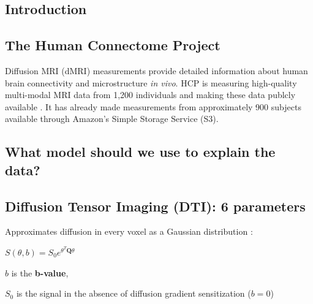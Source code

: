 \documentclass[a0, landscape]{a0poster}
\begin{document}
\begin{multicols}{3} %


\section*{Introduction}

\subsection*{The Human Connectome Project}

Diffusion MRI (dMRI) measurements provide detailed information about human brain
connectivity and microstructure \emph{in vivo}. HCP is measuring high-quality
multi-modal MRI data from 1,200 individuals and making these data publcly
available \cite{VanEssen2012}. It has already made measurements from
approximately 900 subjects available through Amazon's Simple Storage Service
(S3).

\subsection*{What model should we use to explain the data?}

\subsection*{Diffusion Tensor Imaging (DTI): 6 parameters}

Approximates diffusion in every voxel as a Gaussian distribution
\cite{Basser1994-hg}:

\vspace{2mm}
\begin{center}
\begin{large}

$S(\theta, b) = S_0 e^{\theta^T \mathbf{Q} \theta} $

\end{large}
\end{center}

\noindent $b$ is the \textbf {b-value},

\noindent $S_0$ is the signal in the absence of diffusion gradient sensitization ($b=0$)


\end{multicols}
\end{document}
